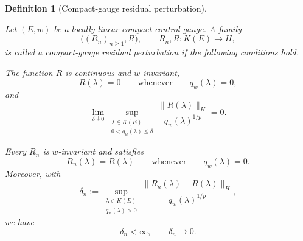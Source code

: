 \documentclass[a4paper,10pt]{article}
\newtheorem{defin}[thm]{Definition}
\begin{document}
\begin{defin}[Compact-gauge residual perturbation]
\label{def:compact-gauge-residual-perturbation}

Let \((E,w)\) be a locally linear compact control gauge. A family
\[
        \bigl((R_n)_{n\ge1},R\bigr),
        \qquad
        R_n,R:K(E)\longrightarrow H,
\]
is called a compact-gauge residual perturbation if the following
conditions hold.

The function \(R\) is continuous and \(w\)-invariant,
\[
        R(\lambda)=0
        \qquad\text{whenever}\qquad
        q_w(\lambda)=0,
\]
and
\[
\lim_{\delta\downarrow0}
\sup_{\substack{\lambda\in K(E)\\
                 0<q_w(\lambda)\le\delta}}
\frac{\lVert R(\lambda)\rVert_H}
     {q_w(\lambda)^{1/p}}
=
0.
\]

Every \(R_n\) is \(w\)-invariant and satisfies
\[
        R_n(\lambda)=R(\lambda)
        \qquad\text{whenever}\qquad
        q_w(\lambda)=0.
\]
Moreover, with
\[
        \delta_n
        :=
        \sup_{\substack{\lambda\in K(E)\\q_w(\lambda)>0}}
        \frac{
        \lVert R_n(\lambda)-R(\lambda)\rVert_H
        }{
        q_w(\lambda)^{1/p}
        },
\]
we have
\[
        \delta_n<\infty,
        \qquad
        \delta_n\longrightarrow0.
\]
\end{defin}
\end{document}
